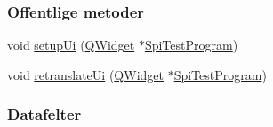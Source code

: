 \subsubsection*{Offentlige metoder}
\begin{DoxyCompactItemize}
\item 
void \hyperlink{class_ui___spi_test_program_a6408f1f402f52e12590b3e4968c84e34}{setup\+Ui} (\hyperlink{class_q_widget}{Q\+Widget} $\ast$\hyperlink{class_spi_test_program}{Spi\+Test\+Program})
\item 
void \hyperlink{class_ui___spi_test_program_a0a1a85fdc36cee52aac338ef3494f996}{retranslate\+Ui} (\hyperlink{class_q_widget}{Q\+Widget} $\ast$\hyperlink{class_spi_test_program}{Spi\+Test\+Program})
\end{DoxyCompactItemize}
\subsubsection*{Datafelter}
